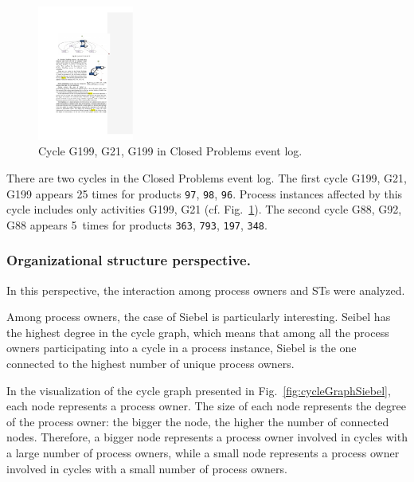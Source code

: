 \documentclass[lnbip]{svmultln}
\begin{document}
\begin{figure}
  \vspace{-28pt}
  \begin{center}
    \includegraphics[width=0.28\textwidth]{"figs/pic 25"}
  \end{center}
  \caption{Cycle G199, G21, G199 in Closed Problems event log.}
  \label{fig:cycleG199G21G199}
  \vspace{-20pt}
\end{figure}

There are two cycles in the Closed Problems event log. The first cycle G199, G21, G199 appears 25 times for products \texttt{97}, \texttt{98}, \texttt{96}. Process instances affected by this cycle includes only activities G199, G21 (cf. Fig.~\ref{fig:cycleG199G21G199}). The second cycle G88, G92, G88 appears 5~times for products \texttt{363}, \texttt{793}, \texttt{197}, \texttt{348}.



\subsubsection{Organizational structure perspective.} In this perspective, the interaction among process owners and STs were analyzed.

Among process owners, the case of Siebel is particularly interesting. Seibel has the highest degree in the cycle graph, which means that among all the process owners participating into a cycle in a process instance, Siebel is the one connected to the highest number of unique process owners.

In the visualization of the cycle graph presented in Fig.~\ref{fig:cycleGraphSiebel}, each node represents a process owner. The size of each node represents the degree of the process owner: the bigger the node, the higher the number of connected nodes. Therefore, a bigger node represents a process owner involved in cycles with a large number of process owners, while a small node represents a process owner involved in cycles with a small number of process owners.
\end{document}
